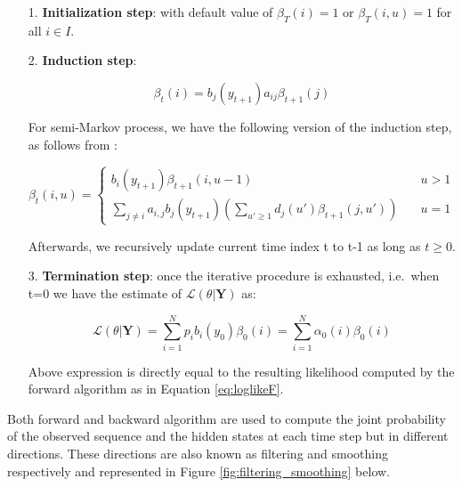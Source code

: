 \begin{itemize}
\item[1.] \textbf{Initialization step}: with default value of $\beta_T(i) = 1$ or $\beta_T(i,u) = 1$ for all $i \in I$.
\item[2.] \textbf{Induction step}: 

\begin{equation}
    \beta_t(i) = b_j(y_{t+1})a_{ij} \beta_{t+1}(j)
\end{equation}

For semi-Markov process, we have the following version of the induction step, as follows from \citep{Yu2013}:

\begin{equation}
    \beta_t(i,u) =
    \begin{cases} 
        b_i(y_{t+1}) \beta_{t+1}(i,u-1) & \quad u > 1 \\
        \sum\limits_{j \neq i} a_{i,j} b_j(y_{t+1}) \left( \sum\limits_{u' \geq 1} d_j(u') \beta_{t+1}(j,u')\right) & \quad u = 1
     \end{cases}
\end{equation}

Afterwards, we recursively update current time index t to t-1 as long as $t \geq 0$.

\item[3.] \textbf{Termination step}: once the iterative procedure is exhausted, i.e.\ when t=0 we have the estimate of $\mathcal{L}(\theta| \textbf{Y})$ as:

\begin{equation}
    \mathcal{L}(\theta| \textbf{Y}) = \sum_{i=1}^N p_{i} b_i(y_{0}) \beta_{0}(i) = \sum_{i=1}^N \alpha_0(i) \beta_{0}(i)
\end{equation}

Above expression is directly equal to the resulting likelihood computed by the forward algorithm as in Equation \ref{eq:loglikeF}.

\end{itemize}

Both forward and backward algorithm are used to compute the joint probability of the observed sequence and the hidden states at each time step but in different directions.
These directions are also known as filtering and smoothing respectively and represented in Figure \ref{fig:filtering_smoothing} below.

